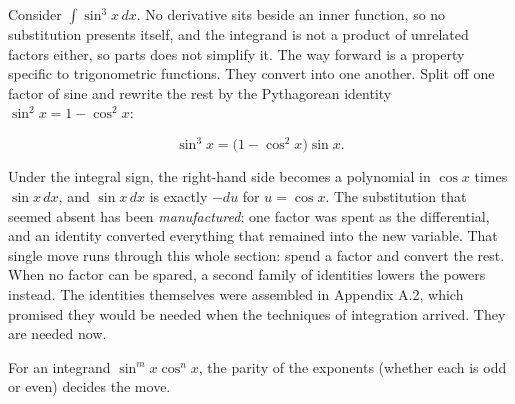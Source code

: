 \documentclass[a4paper,12pt,oneside]{memoir}
\begin{document}
Consider \(\int \sin^{3}x\,dx\). No derivative sits beside an inner function, so no substitution presents itself, and the integrand is not a product of unrelated factors either, so parts does not simplify it. The way forward is a property specific to trigonometric functions. They convert into one another. Split off one factor of sine and rewrite the rest by the Pythagorean identity \(\sin^{2}x = 1 - \cos^{2}x\):

\[ \sin^{3}x = \bigl(1 - \cos^{2}x\bigr)\sin x. \]

Under the integral sign, the right-hand side becomes a polynomial in \(\cos x\) times \(\sin x\,dx\), and \(\sin x\,dx\) is exactly \(-du\) for \(u = \cos x\). The substitution that seemed absent has been \emph{manufactured}: one factor was spent as the differential, and an identity converted everything that remained into the new variable. That single move runs through this whole section: spend a factor and convert the rest. When no factor can be spared, a second family of identities lowers the powers instead. The identities themselves were assembled in Appendix A.2, which promised they would be needed when the techniques of integration arrived. They are needed now.

For an integrand \(\sin^{m}x\cos^{n}x\), the parity of the exponents (whether each is odd or even) decides the move.
\end{document}
